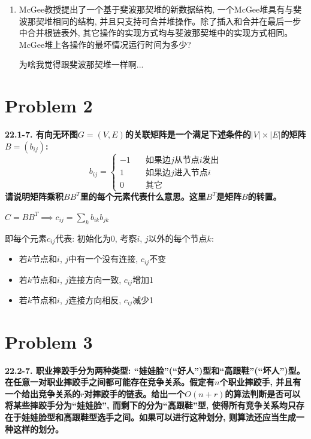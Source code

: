 \documentclass[paper=a4, fontsize=11pt]{scrartcl} %
\numberwithin{equation}{section} %
\numberwithin{figure}{section} %
\numberwithin{table}{section} %
\begin{document}
\begin{enumerate}[a]
\begin{addmargin}[3em]{0em}
    课上已经证明对于斐波那契堆中的任意一棵树$x$, $k = x.\mbox{degree}$有:
    \[
    \mbox{size}(x) \geq F_{k+2} \geq \phi^k
    \]
    其中$\phi = \frac{1 + \sqrt{5}}{2}$, 又有$\mbox{size}(x) \leq n$, 可得: $k \leq \log_\phi (n)$.
  \end{addmargin}

\item McGee教授提出了一个基于斐波那契堆的新数据结构, 一个McGee堆具有与斐波那契堆相同的结构, 并且只支持可合并堆操作。除了插入和合并在最后一步中合并根链表外, 其它操作的实现方式均与斐波那契堆中的实现方式相同。McGee堆上各操作的最坏情况运行时间为多少?

  为啥我觉得跟斐波那契堆一样啊...
  \end{enumerate}

\section{Problem 2}
\textbf{22.1-7. 有向无环图$G=(V, E)$的关联矩阵是一个满足下述条件的$|V| \times |E|$的矩阵$B=(b_{ij})$:}
\[
b_{ij} =
\begin{cases}
  -1 & \quad \text{如果边$j$从节点$i$发出}\\
  1 & \quad \text{如果边$j$进入节点$i$}\\
  0 & \quad \text{其它}
\end{cases}
\]
\textbf{请说明矩阵乘积$BB^T$里的每个元素代表什么意思。这里$B^T$是矩阵$B$的转置。}

$C = BB^T \implies c_{ij} = \sum_k {b_{ik} b_{jk}}$

即每个元素$c_{ij}$代表: 初始化为0, 考察$i$, $j$以外的每个节点$k$:
\begin{itemize}
\item 若$k$节点和$i$, $j$中有一个没有连接, $c_{ij}$不变
\item 若$k$节点和$i$, $j$连接方向一致, $c_{ij}$增加1
\item 若$k$节点和$i$, $j$连接方向相反, $c_{ij}$减少1
\end{itemize}

\section{Problem 3}
\textbf{22.2-7. 职业摔跤手分为两种类型: ``娃娃脸''(``好人'')型和``高跟鞋''(``坏人'')型。在任意一对职业摔跤手之间都可能存在竞争关系。假定有$n$个职业摔跤手, 并且有一个给出竞争关系的$r$对摔跤手的链表。给出一个$O(n+r)$的算法判断是否可以将某些摔跤手分为``娃娃脸'', 而剩下的分为``高跟鞋''型, 使得所有竞争关系均只存在于娃娃脸型和高跟鞋型选手之间。如果可以进行这种划分, 则算法还应当生成一种这样的划分。}
\end{document}
